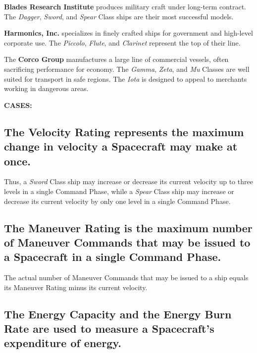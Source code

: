 \textbf{Blades Research Institute} produces military craft under
long-term contract. The \emph{Dagger}, \emph{Sword}, and \emph{Spear}
Class ships are their most successful models.

\textbf{Harmonics, Inc.} specializes in finely crafted ships for
government and high-level corporate use. The \emph{Piccolo},
\emph{Flute}, and \emph{Clarinet} represent the top of their line.

The \textbf{Corco Group} manufactures a large line of commercial
vessels, often sacrificing performance for economy. The \emph{Gamma},
\emph{Zeta}, and \emph{Mu} Classes are well suited for transport in
safe regions. The \emph{Iota} is designed to appeal to merchants
working in dangerous areas.

\medskip

\noindent\textbf{CASES:}

\subsection[Velocity Rating]{The Velocity Rating represents the
  maximum change in 
  velocity a Spacecraft may make at once.}
\label{sec:velocity-rating}



Thus, a \emph{Sword} Class ship may increase or decrease its current
velocity up to three levels in a single Command Phase, while a
\emph{Spear} Class ship may increase or decrease its current velocity
by only one level in a single Command Phase.

\subsection[Maneuver Rating]{The Maneuver Rating is the maximum number
  of Maneuver Commands that may be issued to a  
Spacecraft in a single Command Phase.}
\label{sec:maneuver-rating}



The actual number of Maneuver Commands that may be issued to a ship
equals its Maneuver Rating minus its current velocity.

\subsection[Energy Capacity And Burn Rate]{The Energy Capacity and the
  Energy Burn Rate are used to 
  measure a Spacecraft's expenditure of energy.}
\label{sec:energy-capacity-burn}




